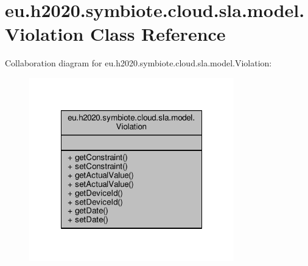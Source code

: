 \hypertarget{classeu_1_1h2020_1_1symbiote_1_1cloud_1_1sla_1_1model_1_1Violation}{}\section{eu.\+h2020.\+symbiote.\+cloud.\+sla.\+model.\+Violation Class Reference}
\label{classeu_1_1h2020_1_1symbiote_1_1cloud_1_1sla_1_1model_1_1Violation}


Collaboration diagram for eu.\+h2020.\+symbiote.\+cloud.\+sla.\+model.\+Violation\+:
\nopagebreak
\begin{figure}[H]
\begin{center}
\leavevmode
\includegraphics[width=252pt]{classeu_1_1h2020_1_1symbiote_1_1cloud_1_1sla_1_1model_1_1Violation__coll__graph}
\end{center}
\end{figure}
